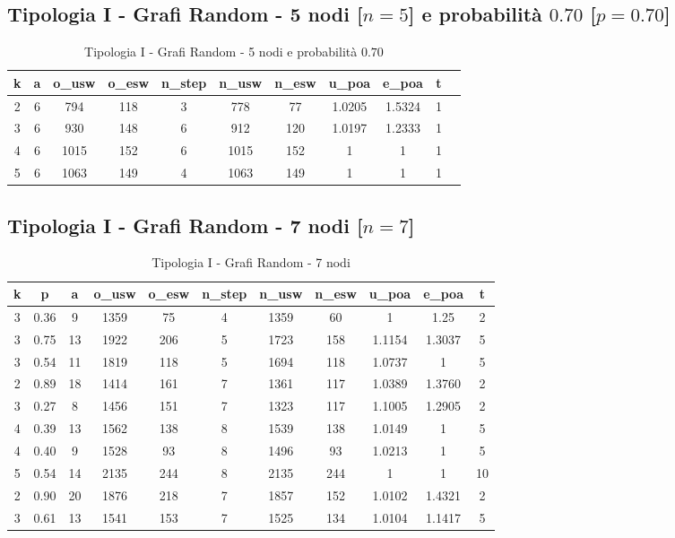 \subsection{Tipologia I - Grafi Random - 5 nodi [$n=5$] e probabilità $0.70$ [$p=0.70$]}

\begin{table}[H]
\centering
\scalebox{0.9} {
\begin{tabular}{|c|c|c|c|c|c|c|c|c|c|c|}
\hline
\textbf{k} & \textbf{a} & \textbf{o\_usw} & \textbf{o\_esw} & \textbf{n\_step} & \textbf{n\_usw} & \textbf{n\_esw} & \textbf{u\_poa} & \textbf{e\_poa} & \textbf{t} \\ \hline
2 & 6 & 794 & 118 & 3 & 778 & 77 & 1.0205 & 1.5324 & 1 \\ \hline
3 & 6 & 930 & 148 & 6 & 912 & 120 & 1.0197 & 1.2333 & 1 \\ \hline
4 & 6 & 1015 & 152 & 6 & 1015 & 152 & 1 & 1 & 1 \\ \hline
5 & 6 & 1063 & 149 & 4 & 1063 & 149 & 1 & 1 & 1 \\ \hline
\end{tabular}
}
\caption{Tipologia I - Grafi Random - 5 nodi e probabilità $0.70$}
\label{tab:sperimentazione-tipo1-5nodi070probab}
\end{table}

\subsection{Tipologia I - Grafi Random - 7 nodi [$n=7$]}

\begin{table}[H]
\centering
\scalebox{0.9} {
\begin{tabular}{|c|c|c|c|c|c|c|c|c|c|c|}
\hline
\textbf{k} & \textbf{p} & \textbf{a} & \textbf{o\_usw} & \textbf{o\_esw} & \textbf{n\_step} & \textbf{n\_usw} & \textbf{n\_esw} & \textbf{u\_poa} & \textbf{e\_poa} & \textbf{t} \\ \hline
3 & 0.36 & 9 & 1359 & 75 & 4 & 1359 & 60 & 1 & 1.25 & 2 \\ \hline
3 & 0.75 & 13 & 1922 & 206 & 5 & 1723 & 158 & 1.1154 & 1.3037 & 5 \\ \hline
3 & 0.54 & 11 & 1819 & 118 & 5 & 1694 & 118 & 1.0737 & 1 & 5 \\ \hline
2 & 0.89 & 18 & 1414 & 161 & 7 & 1361 & 117 & 1.0389 & 1.3760 & 2 \\ \hline
3 & 0.27 & 8 & 1456 & 151 & 7 & 1323 & 117 & 1.1005 & 1.2905 & 2 \\ \hline
4 & 0.39 & 13 & 1562 & 138 & 8 & 1539 & 138 & 1.0149 & 1 & 5 \\ \hline
4 & 0.40 & 9 & 1528 & 93 & 8 & 1496 & 93 & 1.0213 & 1 & 5 \\ \hline
5 & 0.54 & 14 & 2135 & 244 & 8 & 2135 & 244 & 1 & 1 & 10 \\ \hline
2 & 0.90 & 20 & 1876 & 218 & 7 & 1857 & 152 & 1.0102 & 1.4321 & 2 \\ \hline
3 & 0.61 & 13 & 1541 & 153 & 7 & 1525 & 134 & 1.0104 & 1.1417 & 5 \\ \hline
\end{tabular}
}
\caption{Tipologia I - Grafi Random - 7 nodi}
\label{tab:sperimentazione-tipo1-7nodi}
\end{table}


